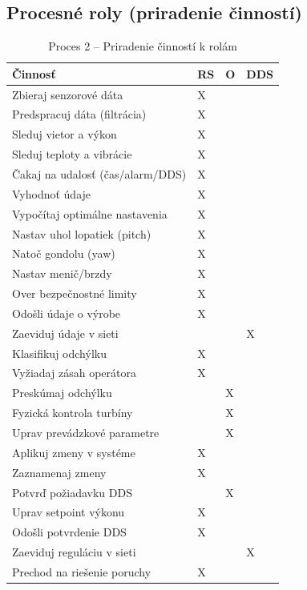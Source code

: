 \documentclass[12pt,a4paper]{article}
\begin{document}
\subsection{Procesné roly (priradenie činností)}
\begin{table}[H]
  \centering
  \small
  \renewcommand{\arraystretch}{1.2}
  \begin{tabularx}{\textwidth}{|X|p{}|p{}|p{}|}
    \hline
    \textbf{Činnosť} & \textbf{RS} & \textbf{O} & \textbf{DDS} \\
    \hline
    Zbieraj senzorové dáta & X &  &  \\
    \hline
    Predspracuj dáta (filtrácia) & X &  &  \\
    \hline
    Sleduj vietor a výkon & X &  &  \\
    \hline
    Sleduj teploty a vibrácie & X &  &  \\
    \hline
    Čakaj na udalosť (čas/alarm/DDS) & X &  &  \\
    \hline
    Vyhodnoť údaje & X &  &  \\
    \hline
    Vypočítaj optimálne nastavenia & X &  &  \\
    \hline
    Nastav uhol lopatiek (pitch) & X &  &  \\
    \hline
    Natoč gondolu (yaw) & X &  &  \\
    \hline
    Nastav menič/brzdy & X &  &  \\
    \hline
    Over bezpečnostné limity & X &  &  \\
    \hline
    Odošli údaje o výrobe & X &  &  \\
    \hline
    Zaeviduj údaje v sieti &  &  & X \\
    \hline
    Klasifikuj odchýlku & X &  &  \\
    \hline
    Vyžiadaj zásah operátora & X &  &  \\
    \hline
    Preskúmaj odchýlku &  & X &  \\
    \hline
    Fyzická kontrola turbíny &  & X &  \\
    \hline
    Uprav prevádzkové parametre &  & X &  \\
    \hline
    Aplikuj zmeny v systéme & X &  &  \\
    \hline
    Zaznamenaj zmeny & X &  &  \\
    \hline
    Potvrď požiadavku DDS &  & X &  \\
    \hline
    Uprav setpoint výkonu & X &  &  \\
    \hline
    Odošli potvrdenie DDS & X &  &  \\
    \hline
    Zaeviduj reguláciu v sieti &  &  & X \\
    \hline
    Prechod na riešenie poruchy & X &  &  \\
    \hline
  \end{tabularx}
  \caption{Proces 2 -- Priradenie činností k rolám}
\end{table}
\end{document}
